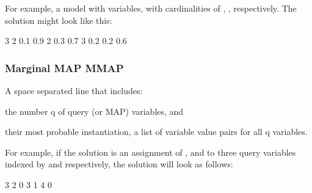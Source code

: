For example, a model with {} variables, with cardinalities of {}, {}, {} respectively. The solution might look like this\+: \begin{DoxyVerb}    3 2 0.1 0.9 2 0.3 0.7 3 0.2 0.2 0.6
\end{DoxyVerb}


\subsubsection*{Marginal M\+A\+P {\ttfamily M\+M\+A\+P}}

A space separated line that includes\+:
\begin{DoxyItemize}
\item the number {\ttfamily q} of query (or M\+A\+P) variables, and
\item their most probable instantiation, a list of variable value pairs for all {\ttfamily q} variables.
\end{DoxyItemize}

For example, if the solution is an assignment of {}, {} and {} to three query variables indexed by {} {} and {} respectively, the solution will look as follows\+: \begin{DoxyVerb}    3 2 0 3 1 4 0\end{DoxyVerb}
 